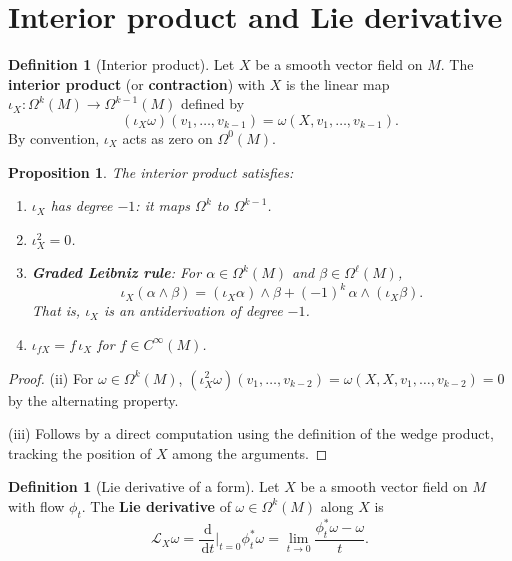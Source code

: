 \documentclass[12pt,a4paper,openany]{book}
\newtheorem{proposition}[theorem]{Proposition}
\theoremstyle{definition}
\newtheorem{definition}[theorem]{Definition}
\theoremstyle{remark}
\newcommand{\dd}{\,\mathrm{d}}
\begin{document}
\section{Interior product and Lie derivative}\label{sec:interior-lie}

\begin{definition}[Interior product]\label{def:interior-product}
Let $X$ be a smooth vector field on $M$. The \textbf{interior product}
(or \textbf{contraction}) with $X$ is the linear map
$\iota_X \colon \Omega^k(M) \to \Omega^{k-1}(M)$ defined by
\[
  (\iota_X \omega)(v_1, \ldots, v_{k-1})
    = \omega(X, v_1, \ldots, v_{k-1}).
\]
By convention, $\iota_X$ acts as zero on $\Omega^0(M)$.
\end{definition}

\begin{proposition}\label{prop:interior-product-properties}
The interior product satisfies:
\begin{enumerate}[label=(\roman*)]
  \item $\iota_X$ has degree $-1$: it maps $\Omega^k$ to $\Omega^{k-1}$.
  \item $\iota_X^2 = 0$.
  \item \textbf{Graded Leibniz rule}: For $\alpha \in \Omega^k(M)$ and
    $\beta \in \Omega^\ell(M)$,
    \[
      \iota_X(\alpha \wedge \beta) = (\iota_X \alpha) \wedge \beta
        + (-1)^k\, \alpha \wedge (\iota_X \beta).
    \]
    That is, $\iota_X$ is an antiderivation of degree $-1$.
  \item $\iota_{fX} = f\, \iota_X$ for $f \in C^\infty(M)$.
\end{enumerate}
\end{proposition}

\begin{proof}
(ii) For $\omega \in \Omega^k(M)$,
$(\iota_X^2 \omega)(v_1, \ldots, v_{k-2})
= \omega(X, X, v_1, \ldots, v_{k-2}) = 0$ by the alternating property.

(iii) Follows by a direct computation using the definition of the wedge
product, tracking the position of $X$ among the arguments.
\end{proof}

\begin{definition}[Lie derivative of a form]\label{def:lie-derivative-form}
Let $X$ be a smooth vector field on $M$ with flow $\phi_t$. The
\textbf{Lie derivative} of $\omega \in \Omega^k(M)$ along $X$ is
\[
  \mathcal{L}_X \omega = \frac{\dd}{\dd t}\bigg|_{t=0} \phi_t^* \omega
  = \lim_{t \to 0} \frac{\phi_t^* \omega - \omega}{t}.
\]
\end{definition}
\end{document}
